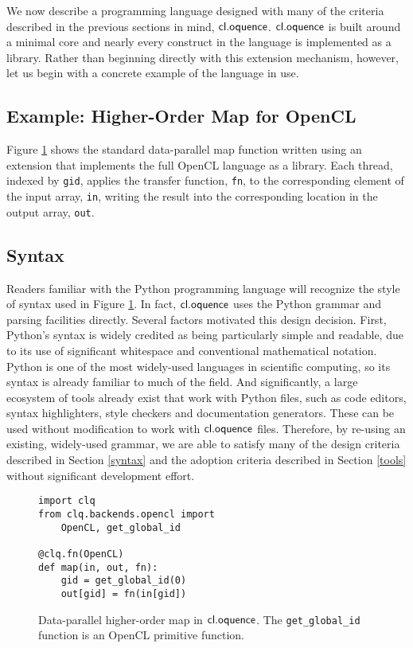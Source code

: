 \documentclass[10pt, conference, compsocconf]{IEEEtran}
\begin{document}
We now describe a programming language designed with many of the criteria described in the previous sections in mind, $\textsf{cl.oquence}$. $\textsf{cl.oquence}$ is built around a minimal core and nearly every construct in the language is implemented as a library. Rather than beginning directly with this extension mechanism, however, let us begin with a concrete example of the language in use.

\subsection{Example: Higher-Order Map for OpenCL}
Figure \ref{map} shows the standard data-parallel map function written using an extension that implements the full OpenCL language as a library. Each thread, indexed by \verb|gid|, applies the transfer function, \verb|fn|, to the  corresponding element of the input array, \verb|in|, writing the result into the corresponding location in the output array, \verb|out|.

\subsection{Syntax}
Readers familiar with the Python programming language will recognize the style of syntax used in Figure \ref{map}. In fact, $\textsf{cl.oquence}$ uses the Python grammar and parsing facilities directly. Several factors motivated this design decision. First, Python's syntax is widely credited as being particularly simple and readable, due to its use of significant whitespace and conventional mathematical notation. Python is one of the most widely-used languages in scientific computing, so its syntax is already familiar to much of the field. And significantly, a large ecosystem of tools already exist that work with Python files, such as code editors, syntax highlighters, style checkers and documentation generators. These can be used without modification to work with $\textsf{cl.oquence}$ files. Therefore, by re-using an existing, widely-used grammar, we are able to satisfy many of the design criteria described in Section \ref{syntax} and the adoption criteria described in Section \ref{tools} without significant development effort.

\begin{figure}
\small{
\begin{verbatim}
import clq
from clq.backends.opencl import 
    OpenCL, get_global_id

@clq.fn(OpenCL)
def map(in, out, fn):
    gid = get_global_id(0)
    out[gid] = fn(in[gid])
\end{verbatim}}
\caption{Data-parallel higher-order map in $\textsf{cl.oquence}$. The \texttt{get\_global\_id} function is an OpenCL primitive function.}
\label{map}

\end{figure}
\end{document}
